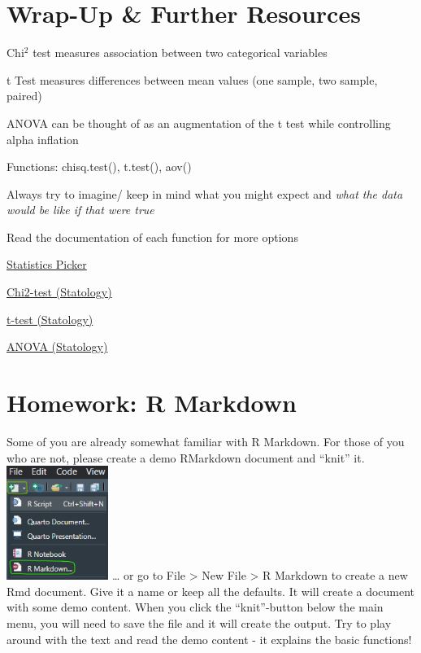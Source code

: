 \documentclass[
]{book}
\begin{document}
\section{Wrap-Up \& Further Resources}\label{wrap-up-further-resources-6}

Chi\(^2\) test measures association between two categorical variables

t Test measures differences between mean values (one sample, two sample, paired)

ANOVA can be thought of as an augmentation of the t test while controlling alpha inflation

Functions: chisq.test(), t.test(), aov()

Always try to imagine/ keep in mind what you might expect and \emph{what the data would be like if that were true}

Read the documentation of each function for more options

\href{https://the-tave.shinyapps.io/Statistics-Picker/}{Statistics Picker}

\href{https://www.statology.org/chi-square-test-of-independence-in-r/}{Chi2-test (Statology)}

\href{https://www.statology.org/two-sample-t-test/}{t-test (Statology)}

\href{https://www.statology.org/interpret-anova-results-in-r/}{ANOVA (Statology)}

\section{\texorpdfstring{ Homework: R Markdown}{ Homework: R Markdown}}\label{homework-r-markdown}

Some of you are already somewhat familiar with R Markdown.
For those of you who are not, please create a demo RMarkdown document and ``knit'' it.
\includegraphics[width=\textwidth,height=1.45833in]{./img/rmd-click.png} \ldots{} or go to File \textgreater{} New File \textgreater{} R Markdown to create a new Rmd document.
Give it a name or keep all the defaults.
It will create a document with some demo content.
When you click the ``knit''-button below the main menu, you will need to save the file and it will create the output.
Try to play around with the text and read the demo content - it explains the basic functions!
\end{document}
